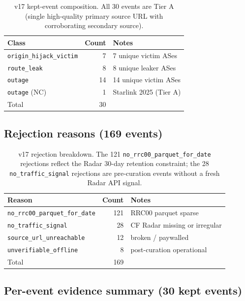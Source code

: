 \documentclass[sigcomm,nonatbib]{acmart}
\begin{document}
\begin{table}[t][h]
\centering
\caption{v17 kept-event composition. All 30 events are
Tier A (single high-quality primary source URL with
corroborating secondary source).}
\label{tab:s17-comp}
\small
\setlength{\tabcolsep}{4pt}
\begin{tabular}{p{}rp{}}
\hline
Class & Count & Notes \\ \hline
\texttt{origin\_hijack\_victim} & 7 & 7 unique victim ASes \\
\texttt{route\_leak} & 8 & 8 unique leaker ASes \\
\texttt{outage} & 14 & 14 unique victim ASes \\
\texttt{outage} (NC) & 1 & Starlink 2025 (Tier A) \\
\hline
Total & 30 & \\
\hline
\end{tabular}
\end{table}

\subsection{Rejection reasons (169 events)}

\begin{table}[t][h]
\centering
\caption{v17 rejection breakdown. The 121
\texttt{no\_rrc00\_parquet\_for\_date}
rejections reflect the \cf{} Radar 30-day retention
constraint; the 28
\texttt{no\_traffic\_signal} rejections
are pre-curation events without a fresh Radar API signal.}
\label{tab:s17-rej}
\small
\setlength{\tabcolsep}{4pt}
\begin{tabular}{p{}rp{}}
\hline
Reason & Count & Notes \\ \hline
\texttt{no\_rrc00\_parquet\_for\_date} & 121 & RRC00 parquet sparse \\
\texttt{no\_traffic\_signal} & 28 & CF Radar missing or irregular \\
\texttt{source\_url\_unreachable} & 12 & broken / paywalled \\
\texttt{unverifiable\_offline} & 8 & post-curation operational \\
\hline
Total & 169 & \\
\hline
\end{tabular}
\end{table}

\subsection{Per-event evidence summary (30 kept events)}
\end{document}
